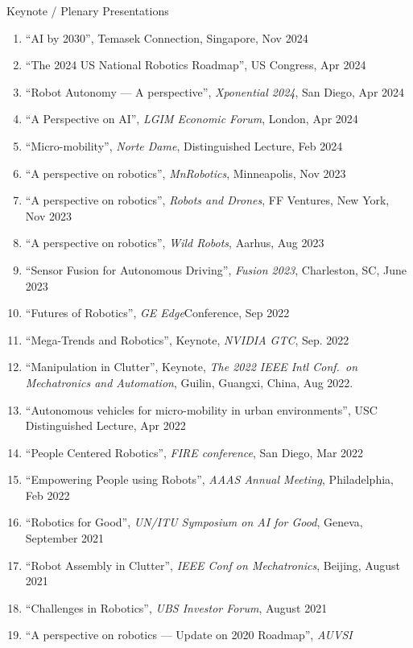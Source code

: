 \documentclass{article}
\begin{document}
\begin{cv}
\begin{cvlist}{Keynote / Plenary Presentations}
  \item
  \begin{enumerate}
    \item ``AI by 2030'', Temasek Connection, Singapore, Nov 2024
    \item ``The 2024 US National Robotics Roadmap'', US Congress, Apr 2024
    \item ``Robot Autonomy --- A perspective'', {\em Xponential 2024}, San Diego,
          Apr 2024
    \item ``A Perspective on AI'', {\em LGIM Economic Forum}, London, Apr 2024
    \item ``Micro-mobility'', {\em Norte Dame}, Distinguished Lecture, Feb 2024
    \item ``A perspective on robotics'', {\em MnRobotics}, Minneapolis, Nov 2023
    \item ``A perspective on robotics'', {\em Robots and Drones}, FF Ventures, New
          York, Nov 2023
    \item ``A perspective on robotics'', {\em Wild Robots}, Aarhus, Aug 2023
    \item ``Sensor Fusion for Autonomous Driving'', {\em Fusion 2023}, Charleston,
          SC, June 2023
    \item ``Futures of Robotics'', {\em GE Edge}\@ Conference, Sep 2022
    \item ``Mega-Trends and Robotics'', Keynote, {\em NVIDIA GTC}, Sep. 2022
    \item ``Manipulation in Clutter'', Keynote, {\em The 2022 IEEE Intl Conf.\ on
      Mechatronics and Automation}, Guilin, Guangxi, China, Aug 2022.
    \item ``Autonomous vehicles for micro-mobility in urban environments'', USC
          Distinguished Lecture, Apr 2022
    \item ``People Centered Robotics'', {\em FIRE conference}, San Diego, Mar
          2022
    \item ``Empowering People using Robots'', {\em AAAS Annual Meeting},
          Philadelphia, Feb 2022
    \item ``Robotics for Good'', {\em UN/ITU Symposium on AI for Good}, Geneva,
          September 2021
    \item ``Robot Assembly in Clutter'', {\em IEEE Conf on Mechatronics}, Beijing,
          August 2021
    \item ``Challenges in Robotics'', {\em UBS Investor Forum}, August 2021
    \item ``A perspective on robotics --- Update on 2020 Roadmap'', {\em AUVSI
}
\end{enumerate}
\end{cvlist}
\end{cv}
\end{document}
